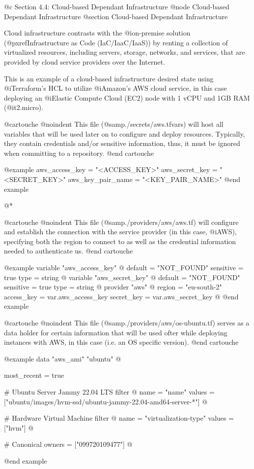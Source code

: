 @c Section 4.4: Cloud-based Dependant Infrastructure
@node Cloud-based Dependant Infrastructure
@section Cloud-based Dependant Infrastructure

Cloud infrastructure contrasts with the @i{on-premise} solution (@pxref{Infrastructure as Code (IaC/IaaC/IaaS)}) by renting a collection of virtualized resources, including servers, storage, networks, and services, that are provided by cloud service providers over the Internet.

This is an example of a cloud-based infrastructure desired state using @i{Terraform's HCL} to utilize @i{Amazon's AWS} cloud service, in this case deploying an @i{Elastic Compute Cloud (EC2)} node with 1 vCPU and 1GB RAM (@i{t2.micro}).

@cartouche
@noindent This file (@samp{./secrets/aws.tfvars}) will host all variables that will be used later on to configure and deploy resources. Typically, they contain credentials and/or sensitive information, thus, it must be ignored when committing to a repository.
@end cartouche

@example
aws_access_key = "<ACCESS_KEY>"
aws_secret_key = "<SECRET_KEY>"
aws_key_pair_name = "<KEY_PAIR_NAME>"
@end example

@*

@cartouche
@noindent This file (@samp{./providers/aws/aws.tf}) will configure and establish the connection with the service provider (in this case, @i{AWS}), specifying both the region to connect to as well as the credential information needed to authenticate us.
@end cartouche

@example
variable "aws_access_key" @{
  default = "NOT_FOUND"
  sensitive = true
  type = string
@}
variable "aws_secret_key" @{
  default = "NOT_FOUND"
  sensitive = true
  type = string
@}
provider "aws" @{
  region = "eu-south-2"
  access_key = var.aws_access_key
  secret_key = var.aws_secret_key
@}
@end example

@cartouche
@noindent This file (@samp{./providers/aws/os-ubuntu.tf}) serves as a data holder for certain information that will be used ofter while deploying instances with AWS, in this case (i.e. an OS specific version).
@end cartouche

@example
data "aws_ami" "ubuntu" @{
  most_recent = true

  # Ubuntu Server Jammy 22.04 LTS
  filter @{
    name = "name"
    values = ["ubuntu/images/hvm-ssd/ubuntu-jammy-22.04-amd64-server-*"]
  @}

  # Hardware Virtual Machine
  filter @{
    name = "virtualization-type"
    values = ["hvm"]
  @}

  # Canonical
  owners = ["099720109477"]
@}
@end example

